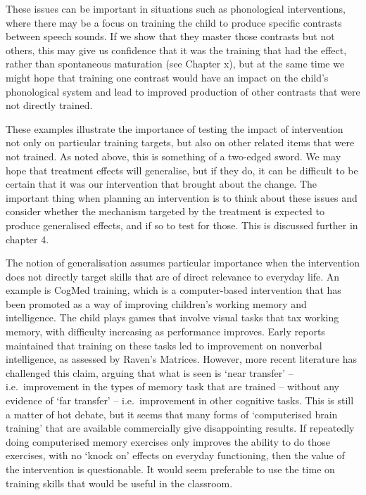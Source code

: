 \documentclass[]{book}
\begin{document}
These issues can be important in situations such as phonological interventions, where there may be a focus on training the child to produce specific contrasts between speech sounds. If we show that they master those contrasts but not others, this may give us confidence that it was the training that had the effect, rather than spontaneous maturation (see Chapter x), but at the same time we might hope that training one contrast would have an impact on the child's phonological system and lead to improved production of other contrasts that were not directly trained.

These examples illustrate the importance of testing the impact of intervention not only on particular training targets, but also on other related items that were not trained. As noted above, this is something of a two-edged sword. We may hope that treatment effects will generalise, but if they do, it can be difficult to be certain that it was our intervention that brought about the change. The important thing when planning an intervention is to think about these issues and consider whether the mechanism targeted by the treatment is expected to produce generalised effects, and if so to test for those. This is discussed further in chapter 4.

The notion of generalisation assumes particular importance when the intervention does not directly target skills that are of direct relevance to everyday life. An example is CogMed training, which is a computer-based intervention that has been promoted as a way of improving children's working memory and intelligence. The child plays games that involve visual tasks that tax working memory, with difficulty increasing as performance improves. Early reports maintained that training on these tasks led to improvement on nonverbal intelligence, as assessed by Raven's Matrices. However, more recent literature has challenged this claim, arguing that what is seen is `near transfer' -- i.e.~improvement in the types of memory task that are trained -- without any evidence of `far transfer' -- i.e.~improvement in other cognitive tasks. This is still a matter of hot debate, but it seems that many forms of `computerised brain training' that are available commercially give disappointing results. If repeatedly doing computerised memory exercises only improves the ability to do those exercises, with no `knock on' effects on everyday functioning, then the value of the intervention is questionable. It would seem preferable to use the time on training skills that would be useful in the classroom.
\end{document}
